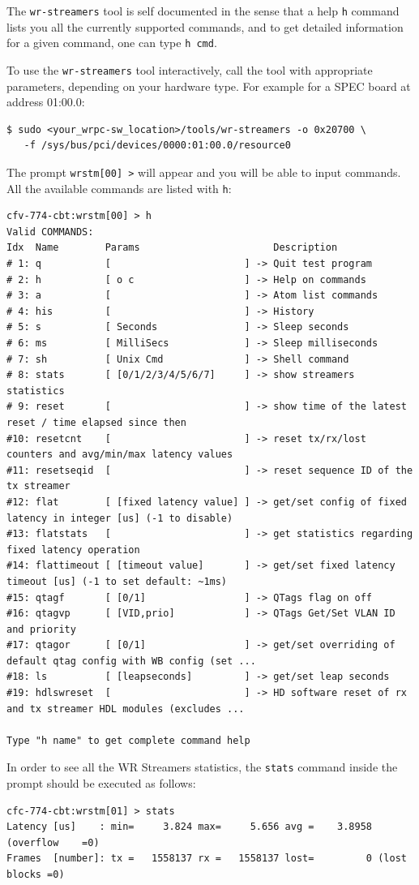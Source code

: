 \documentclass[a4paper, 12pt]{article}
\renewcommand{\_}{\underscore\allowbreak}
\begin{document}
The \texttt{wr-streamers} tool is self documented in the sense that a help
\texttt{h} command lists you all the currently supported commands, and to get
detailed information for a given command, one can type \texttt{h cmd}.

To use the \texttt{wr-streamers} tool interactively, call the tool with appropriate
parameters, depending on your hardware type. For example for a SPEC board at
address 01:00.0:
\begin{lstlisting}
$ sudo <your_wrpc-sw_location>/tools/wr-streamers -o 0x20700 \
   -f /sys/bus/pci/devices/0000:01:00.0/resource0
\end{lstlisting}

The prompt \texttt{wrstm[00] >} will appear and you will be able to input commands.
All the available commands are listed with \texttt{h}:
\begin{lstlisting}[basicstyle=\scriptsize\ttfamily]
cfv-774-cbt:wrstm[00] > h
Valid COMMANDS:
Idx  Name        Params                       Description
# 1: q           [                       ] -> Quit test program
# 2: h           [ o c                   ] -> Help on commands
# 3: a           [                       ] -> Atom list commands
# 4: his         [                       ] -> History
# 5: s           [ Seconds               ] -> Sleep seconds
# 6: ms          [ MilliSecs             ] -> Sleep milliseconds
# 7: sh          [ Unix Cmd              ] -> Shell command
# 8: stats       [ [0/1/2/3/4/5/6/7]     ] -> show streamers statistics
# 9: reset       [                       ] -> show time of the latest reset / time elapsed since then
#10: resetcnt    [                       ] -> reset tx/rx/lost counters and avg/min/max latency values
#11: resetseqid  [                       ] -> reset sequence ID of the tx streamer
#12: flat        [ [fixed latency value] ] -> get/set config of fixed latency in integer [us] (-1 to disable)
#13: flatstats   [                       ] -> get statistics regarding fixed latency operation
#14: flattimeout [ [timeout value]       ] -> get/set fixed latency timeout [us] (-1 to set default: ~1ms)
#15: qtagf       [ [0/1]                 ] -> QTags flag on off
#16: qtagvp      [ [VID,prio]            ] -> QTags Get/Set VLAN ID and priority
#17: qtagor      [ [0/1]                 ] -> get/set overriding of default qtag config with WB config (set ...
#18: ls          [ [leapseconds]         ] -> get/set leap seconds
#19: hdlswreset  [                       ] -> HD software reset of rx and tx streamer HDL modules (excludes ...

Type "h name" to get complete command help
\end{lstlisting}
In order to see all the WR Streamers statistics, the \texttt{stats} command
inside the prompt should be executed as follows:
\begin{lstlisting}
cfc-774-cbt:wrstm[01] > stats
Latency [us]    : min=     3.824 max=     5.656 avg =    3.8958 (overflow    =0)
Frames  [number]: tx =   1558137 rx =   1558137 lost=         0 (lost blocks =0)

\end{lstlisting}
\end{document}
